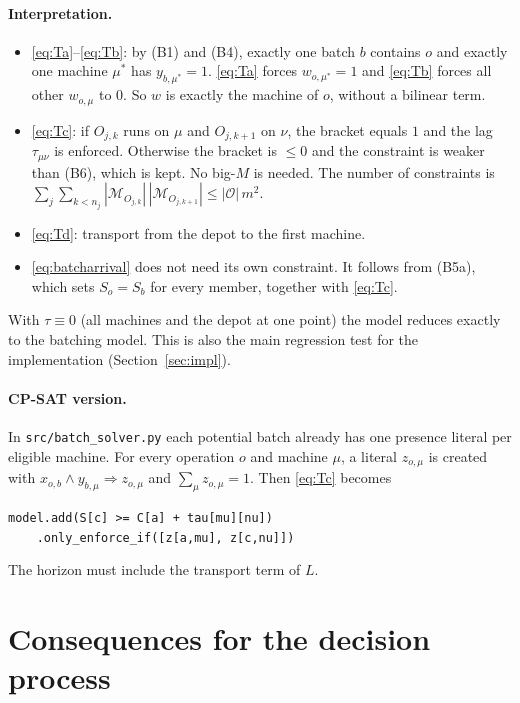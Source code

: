 \documentclass[11pt,a4paper]{article}
\newcommand{\Oset}{\mathcal{O}}
\newcommand{\Mset}{\mathcal{M}}
\begin{document}
\paragraph{Interpretation.}
\begin{itemize}
  \item \eqref{eq:Ta}--\eqref{eq:Tb}: by (B1) and (B4), exactly one batch $b$
    contains $o$ and exactly one machine $\mu^\ast$ has $y_{b,\mu^\ast}=1$.
    \eqref{eq:Ta} forces $w_{o,\mu^\ast}=1$ and \eqref{eq:Tb} forces all other
    $w_{o,\mu}$ to $0$. So $w$ is exactly the machine of $o$, without a
    bilinear term.
  \item \eqref{eq:Tc}: if $O_{j,k}$ runs on $\mu$ and $O_{j,k+1}$ on $\nu$, the
    bracket equals $1$ and the lag $\tau_{\mu\nu}$ is enforced. Otherwise the
    bracket is $\le 0$ and the constraint is weaker than (B6), which is kept.
    No big-$M$ is needed. The number of constraints is
    $\sum_j\sum_{k<n_j}|\Mset_{O_{j,k}}|\,|\Mset_{O_{j,k+1}}|\le|\Oset|\,m^2$.
  \item \eqref{eq:Td}: transport from the depot to the first machine.
  \item \eqref{eq:batcharrival} does not need its own constraint. It follows
    from (B5a), which sets $S_o=S_b$ for every member, together with \eqref{eq:Tc}.
\end{itemize}
With $\tau\equiv0$ (all machines and the depot at one point) the model reduces
exactly to the batching model. This is also the main regression test for the
implementation (Section~\ref{sec:impl}).

\paragraph{CP-SAT version.}
In \texttt{src/batch\_solver.py} each potential batch already has one presence
literal per eligible machine. For every operation $o$ and machine $\mu$, a
literal $z_{o,\mu}$ is created with
$x_{o,b}\wedge y_{b,\mu}\Rightarrow z_{o,\mu}$ and
$\sum_\mu z_{o,\mu}=1$. Then \eqref{eq:Tc} becomes
\begin{center}\small
\texttt{model.add(S[c] >= C[a] + tau[mu][nu])}\\
\texttt{\ \ \ \ .only\_enforce\_if([z[a,mu], z[c,nu]])}
\end{center}
The horizon must include the transport term of $L$.

\section{Consequences for the decision process}
\label{sec:mdp}
\end{document}
